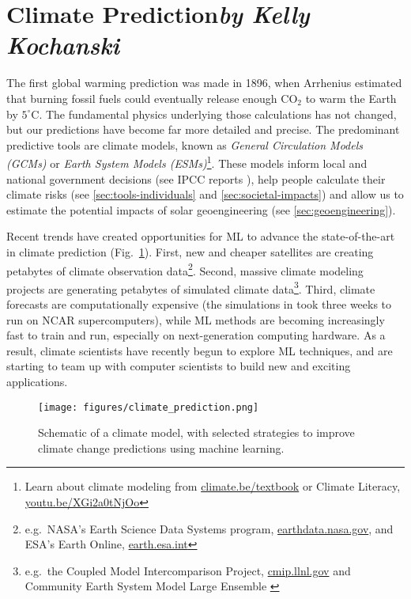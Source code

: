 \documentclass[11pt]{report}
\begin{document}
\section{Climate Prediction\texorpdfstring{\hfill\textit{by Kelly Kochanski}}{}}
\label{sec: climate prediction}


The first global warming prediction was made in 1896, when Arrhenius estimated that burning fossil fuels could eventually release enough CO$_2$ to warm the Earth by $5^\circ$C.
The fundamental physics underlying those calculations has not changed, but our predictions have become far more detailed and precise. The predominant predictive tools are climate models, known as \emph{General Circulation Models (GCMs)} or \emph{Earth System Models (ESMs)}\footnote{Learn about climate modeling from \url{climate.be/textbook} \cite{Goosse} or Climate Literacy, \url{youtu.be/XGi2a0tNjOo}}. These models inform local and national government decisions (see IPCC reports \cite{ipcc2014summary,IPCC2014,ipcc_global_2018}), help people calculate their climate risks (see \textsection\ref{sec:tools-individuals} and \textsection\ref{sec:societal-impacts}) and allow us to estimate the potential impacts of solar geoengineering (see \textsection\ref{sec:geoengineering}).

Recent trends have created opportunities for ML to advance the state-of-the-art in climate prediction (Fig.~\ref{fig:climateModels}). First, new and cheaper satellites are creating petabytes of climate observation data\footnote{e.g.~NASA's Earth Science Data Systems program, \url{earthdata.nasa.gov}, and ESA's Earth Online, \url{earth.esa.int}}. Second, massive climate modeling projects are generating petabytes of simulated climate data\footnote{e.g.~the Coupled Model Intercomparison Project, \url{cmip.llnl.gov} \cite{Taylor2012, Eyring2016} and Community Earth System Model Large Ensemble \cite{Kay2015}}. Third, climate forecasts are computationally expensive \cite{Carman2017} (the simulations in \cite{Kay2015} took three weeks to run on NCAR supercomputers), while ML methods are becoming increasingly fast to train and run, especially on next-generation computing hardware. As a result, climate scientists have recently begun to explore ML techniques, and are starting to team up with computer scientists to build new and exciting applications.

\begin{figure}[bhpt]
    \centering
    \texttt{[image: figures/climate\_prediction.png]}
    \caption{Schematic of a climate model, with selected strategies to improve climate change predictions using machine learning.}
    \label{fig:climateModels}
\end{figure}
\end{document}
